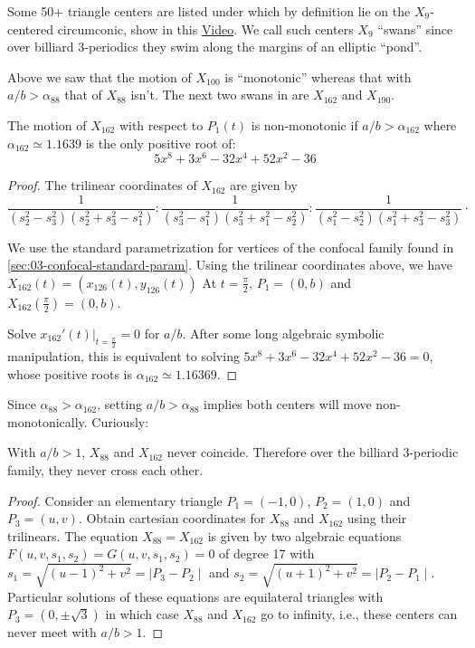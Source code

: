 Some 50+ triangle centers are listed under \cite[X(9)]{etc} which by definition lie on the $X_9$-centered circumconic, show in this \href{https://youtu.be/JdcJt5PExsw}{Video}. We call such centers $X_9$ ``swans'' since over billiard 3-periodics they swim along the margins of an elliptic ``pond''.

Above we saw that the motion of $X_{100}$ is ``monotonic'' whereas that with $a/b>\alpha_{88}$ that of $X_{88}$ isn't. The next two swans in \cite{etc} are $X_{162}$ and $X_{190}$. 

\begin{proposition}
\label{prop:04-x162}
The motion of $X_{162}$ with respect to $P_1(t)$ is non-monotonic if $a/b>\alpha_{162}$ where $\alpha_{162}{\simeq}1.1639$ is the only positive root of:
\[ 5 x^8 + 3 x^6 - 32 x^4 + 52 x^2 - 36 \]
\end{proposition}

\begin{proof}
The trilinear coordinates of $X_{162}$ are given by
{\small 
\[  \frac {1}{ \left( s_2^{2}-  s_3^{2} \right)  \left( s_2^{2}+ s_3^{2}-
s_1^{2} \right) } :  \frac {1}{ \left( s_3^{2}-  s_1^{2} \right)  \left( s_3^{2}+ s_1^{2} -
s_2^{2} \right) }:\frac {1}{ \left( s_1^{2}-  s_2^{2} \right)  \left( s_1^{2}+ s_3^{2} -
s_3^{2}\right) }\cdot
\]
}

We use the standard parametrization for vertices of the confocal family found in \cref{sec:03-confocal-standard-param}. Using the trilinear coordinates above, we have   $X_{162}(t)=(x_{126}(t), y_{126}(t))$ 
  At $t=\frac{\pi}{2}$, $P_1=(0,b)$ and   $X_{162}(\frac{\pi}{2})= (0,b)$.
  
  Solve $x_{162}'(t)|_{t=\frac{\pi}{2}}=0$ for $a/b$. After some long algebraic symbolic manipulation, this is equivalent to solving $5 x^8 + 3 x^6 - 32 x^4 + 52 x^2 - 36=0$, whose positive roots is $  \alpha_{162} \simeq 1.16369.$
\end{proof}

Since $\alpha_{88}>\alpha_{162}$, setting $a/b>\alpha_{88}$ implies both centers will move non-monotonically. Curiously:

\begin{proposition}
With $a/b>1$, $X_{88}$ and $X_{162}$ never coincide. Therefore over the billiard 3-periodic family, they never cross each other.
\end{proposition}

\begin{proof}
Consider an elementary triangle $P_1=(-1,0)$, $P_2=(1,0)$ and $P_3=(u,v)$. Obtain cartesian coordinates for $X_{88}$ and $X_{162}$ using their trilinears. The equation $X_{88}=X_{162}$ is given by two algebraic equations $F(u,v,s_1,s_2)=G(u,v,s_1,s_2)=0$ of degree 17 with   $s_1=\sqrt{(u-1)^2+v^2}=\mid P_3-P_2\mid$ and $s_2=\sqrt{(u+1)^2+v^2}=\mid P_2-P_1\mid$.
Particular solutions of these equations are    equilateral triangles with $P_3=(0,\pm \sqrt{3})$ in which case $X_{88}$ and $X_{162}$ go to infinity, i.e., these centers can never meet with $a/b>1$.
\end{proof}

